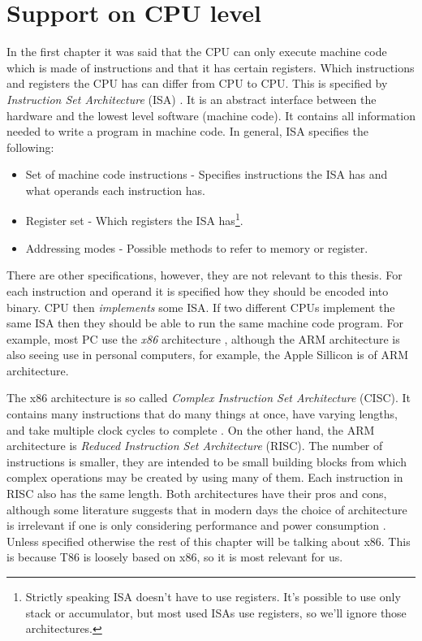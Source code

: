 \section{Support on CPU level} In the first chapter it was said that the CPU
can only execute machine code which is made of instructions and that it has
certain registers. Which instructions and registers the CPU has can differ from
CPU to CPU. This is specified by \textit{Instruction Set Architecture} (ISA)
\cite{aps-isa}. It is an abstract interface between the hardware and the lowest
level software (machine code). It contains all information needed to write a
program in machine code. In general, ISA specifies the following: 
\begin{itemize}
    \item Set of machine code instructions - Specifies instructions the ISA has
        and what operands each instruction has.
    \item Register set - Which registers the ISA has\footnote{Strictly speaking
        ISA doesn't have to use registers. It's possible to use only stack or
        accumulator, but most used ISAs use registers, so we'll ignore those
        architectures. }.   
    \item Addressing modes - Possible methods to refer to memory or register. 
\end{itemize} There are other specifications,
however, they are not relevant to this thesis. For each instruction and operand
it is specified how they should be encoded into binary. CPU then
\textit{implements} some ISA. If two different CPUs implement the same ISA then
they should be able to run the same machine code program. For example, most PC
use the \textit{x86} architecture \cite{aps-isa}, although the ARM architecture
is also seeing use in personal computers, for example, the Apple Sillicon is of
ARM architecture.

The x86 architecture is so called \textit{Complex Instruction Set Architecture}
(CISC). It contains many instructions that do many things at once, have varying
lengths, and take multiple clock cycles to complete \cite{intel-manual}. On the
other hand, the ARM architecture is \textit{Reduced Instruction Set
Architecture} (RISC). The number of instructions is smaller, they are intended
to be small building blocks from which complex operations may be created by
using many of them. Each instruction in RISC also has the same length. Both
architectures have their pros and cons, although some literature suggests that
in modern days the choice of architecture is irrelevant if one is only
considering performance and power consumption \cite{riscvscisc1, riscvscisc2}.
Unless specified otherwise the rest of this chapter will be talking about x86.
This is because T86  is loosely based on x86, so it is most relevant
for us.

